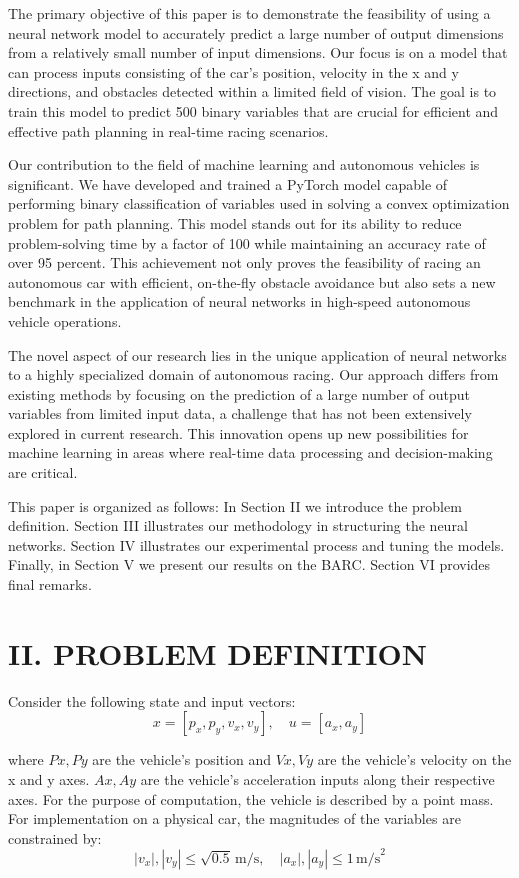 \documentclass[
	letterpaper, %
	10pt, %
	unnumberedsections, %
	twoside, %
]{LTJournalArticle}
\begin{document}
The primary objective of this paper is to demonstrate the feasibility of using a neural network model to accurately predict a large number of output dimensions from a relatively small number of input dimensions. Our focus is on a model that can process inputs consisting of the car’s position, velocity in the x and y directions, and obstacles detected within a limited field of vision. The goal is to train this model to predict 500 binary variables that are crucial for efficient and effective path planning in real-time racing scenarios.

Our contribution to the field of machine learning and autonomous vehicles is significant. We have developed and trained a PyTorch model capable of performing binary classification of variables used in solving a convex optimization problem for path planning. This model stands out for its ability to reduce problem-solving time by a factor of 100 while maintaining an accuracy rate of over 95 percent. This achievement not only proves the feasibility of racing an autonomous car with efficient, on-the-fly obstacle avoidance but also sets a new benchmark in the application of neural networks in high-speed autonomous vehicle operations.

The novel aspect of our research lies in the unique application of neural networks to a highly specialized domain of autonomous racing. Our approach differs from existing methods by focusing on the prediction of a large number of output variables from limited input data, a challenge that has not been extensively explored in current research. This innovation opens up new possibilities for machine learning in areas where real-time data processing and decision-making are critical.

This paper is organized as follows: In Section II we introduce the problem definition. Section III illustrates our methodology in structuring the neural networks. Section IV illustrates our experimental process and tuning the models. Finally, in Section V we present our results on the BARC. Section VI provides final remarks.

\section{II. PROBLEM DEFINITION}

\quad Consider the following state and input vectors:
\[x = [p_x, p_y, v_x, v_y], \quad u = [a_x, a_y]\]

\noindent where \(Px, Py\) are the vehicle’s position and \(Vx, Vy\) are the vehicle’s velocity on the x and y axes. \(Ax, Ay\) are the vehicle’s acceleration inputs along their respective axes. For the purpose of computation, the vehicle is described by a point mass. For implementation on a physical car, the magnitudes of the variables are constrained by:
\[\left| v_x \right|, \left| v_y \right| \leq \sqrt{0.5} \, \text{m/s}, \quad \left| a_x \right|, \left| a_y \right| \leq 1 \, \text{m/s}^2\]
\end{document}
